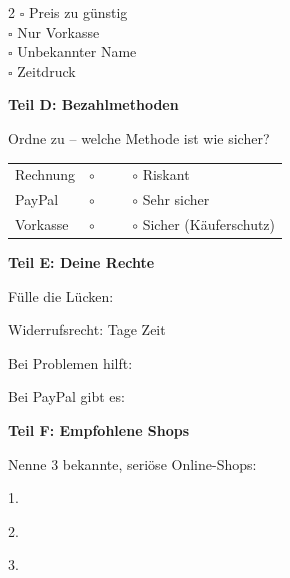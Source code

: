 \documentclass[a4paper,landscape,8pt]{extarticle}
\begin{document}
\begin{multicols}{2}
$\square$ Preis zu günstig\\
$\square$ Nur Vorkasse\\
$\square$ Unbekannter Name\\
$\square$ Zeitdruck

\columnbreak

\textbf{\large Teil D: Bezahlmethoden}

Ordne zu -- welche Methode ist wie sicher?

\vspace{2mm}

\renewcommand{\arraystretch}{1.8}
\begin{tabular}{@{}p{3cm}p{4.5cm}@{}}
Rechnung & $\circ$ ~~~~ $\circ$ Riskant \\
PayPal & $\circ$ ~~~~ $\circ$ Sehr sicher \\
Vorkasse & $\circ$ ~~~~ $\circ$ Sicher (Käuferschutz) \\
\end{tabular}
\renewcommand{\arraystretch}{1}

\vspace{6mm}

\textbf{\large Teil E: Deine Rechte}

Fülle die Lücken:

\vspace{3mm}

Widerrufsrecht: \dotfill Tage Zeit

\vspace{3mm}

Bei Problemen hilft: \dotfill

\vspace{3mm}

Bei PayPal gibt es: \dotfill

\vspace{6mm}

\textbf{\large Teil F: Empfohlene Shops}

Nenne 3 bekannte, seriöse Online-Shops:

\vspace{3mm}

1. \dotfill

\vspace{2mm}

2. \dotfill

\vspace{2mm}

3. \dotfill

\end{multicols}
\end{document}
